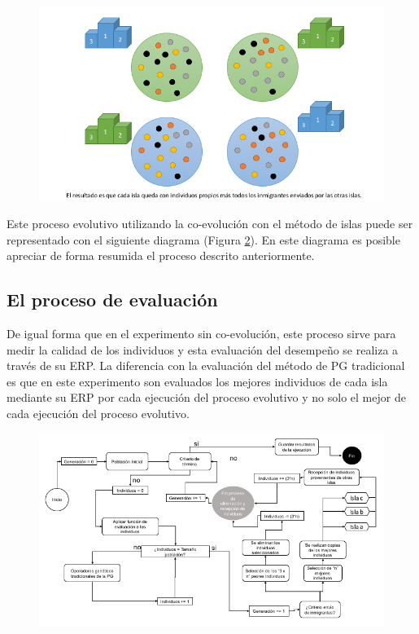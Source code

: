\begin{figure}[H]
    \centering
    \includegraphics[width=14cm]{images/cap3/final_islas.png}
    \label{fig:final_islas}
\end{figure}

Este proceso evolutivo utilizando la co-evolución con el método de islas puede ser representado con el siguiente diagrama (Figura \ref{fig:pg_islas}). En este diagrama es posible apreciar de forma resumida el proceso descrito anteriormente.

\subsection{El proceso de evaluación}
De igual forma que en el experimento sin co-evolución, este proceso sirve para medir la calidad de los individuos y esta evaluación del desempeño se realiza a través de su ERP. La diferencia con la evaluación del método de PG tradicional es que en este experimento son evaluados los mejores individuos de cada isla mediante su ERP por cada ejecución del proceso evolutivo y no solo el mejor de cada ejecución del proceso evolutivo.

\begin{figure}[H]
    \centering
    \includegraphics[width=16cm]{images/cap3/pg_islas.png}
    \label{fig:pg_islas}
\end{figure}


